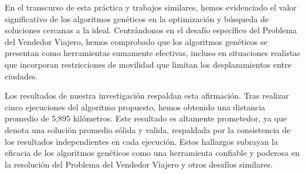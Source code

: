 En el transcurso de esta práctica y trabajos similares, hemos evidenciado el valor significativo de los algoritmos genéticos en la optimización y búsqueda de soluciones cercanas a la ideal. Centrándonos en el desafío específico del Problema del Vendedor Viajero, hemos comprobado que los algoritmos genéticos se presentan como herramientas sumamente efectivas, incluso en situaciones realistas que incorporan restricciones de movilidad que limitan los desplazamientos entre ciudades.

Los resultados de nuestra investigación respaldan esta afirmación. Tras realizar cinco ejecuciones del algoritmo propuesto, hemos obtenido una distancia promedio de 5,895 kilómetros. Este resultado es altamente prometedor, ya que denota una solución promedio sólida y valida, respaldada por la consistencia de los resultados independientes en cada ejecución. Estos hallazgos subrayan la eficacia de los algoritmos genéticos como una herramienta confiable y poderosa en la resolución del Problema del Vendedor Viajero y otros desafíos similares.
